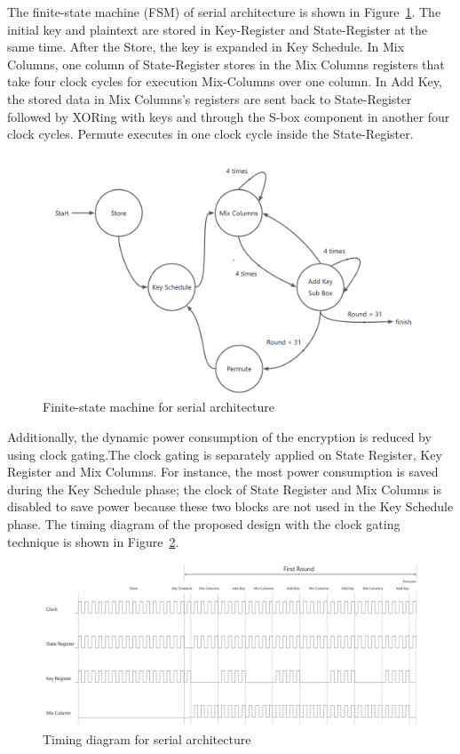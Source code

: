 \documentclass[sn-basic]{sn-jnl}%
\begin{document}
The finite-state machine (FSM) of serial architecture is shown in Figure~\ref{serial_fsm_fig}. 
The initial key and plaintext are stored in Key-Register and State-Register at the same time. After the Store, the key is expanded in Key Schedule. 
In Mix Columns, one column of State-Register stores in the Mix Columns registers that take four clock cycles for execution Mix-Columns over one column. 
In Add Key, the stored data in Mix Columns's registers are sent back to State-Register followed by XORing with keys and through the S-box component in another four clock cycles. 
Permute executes in one clock cycle inside the State-Register.

\begin{figure}[h]%
    \centering
    \includegraphics[width=\textwidth]{serial_fsm.png}
    \caption{Finite-state machine for serial architecture}\label{serial_fsm_fig}
\end{figure}

Additionally, the dynamic power consumption of the encryption is reduced by using clock gating.The clock gating is separately applied on State Register, Key Register and Mix Columns. 
For instance, the most power consumption is saved during the Key Schedule phase; the clock of State Register and Mix Columns is disabled to save power because these two blocks are not used in the Key Schedule phase. 
The timing diagram of the proposed design with the clock gating technique is shown in Figure~\ref{serial_time_diagrm}.

\begin{figure}[h]%
    \centering
    \includegraphics[width=\textwidth]{serial_time.png}
    \caption{Timing diagram for serial architecture}\label{serial_time_diagrm}
\end{figure}
\end{document}
